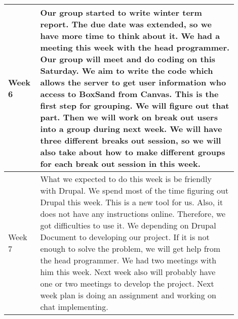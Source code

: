\documentclass[10pt]{article}
\begin{document}
\begin{center}
\begin{tabular}{ | p{0.1\linewidth} | p{0.8\linewidth} | }
            Week 6 & Our group started to write winter term report. The due date was extended, so we have more time to think about it. We had a meeting this week with the head programmer. Our group will meet and do coding on this Saturday. We aim to write the code which allows the server to get user information who access to BoxSand from Canvas. This is the first step for grouping. We will figure out that part. Then we will work on break out users into a group during next week. We will have three different breaks out session, so we will also take about how to make different groups for each break out session in this week.   \\ \hline
            Week 7 & What we expected to do this week is be friendly with Drupal. We spend most of the time figuring out Drupal this week. This is a new tool for us. Also, it does not have any instructions online. Therefore, we got difficulties to use it. We depending on Drupal Document to developing our project. If it is not enough to solve the problem, we will get help from the head programmer. We had two meetings with him this week. Next week also will probably have one or two meetings to develop the project. Next week plan is doing an assignment and working on chat implementing.   \\ \hline 
        \end{tabular}   
    

\end{center}
\end{document}
